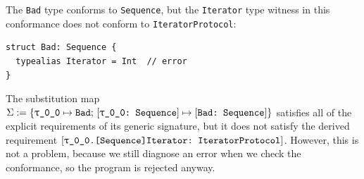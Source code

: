\documentclass[../generics]{subfiles}
\begin{document}
\begin{example}
The \texttt{Bad} type conforms to \texttt{Sequence}, but the \texttt{Iterator} type witness in this conformance does not conform to \texttt{IteratorProtocol}:
\begin{Verbatim}
struct Bad: Sequence {
  typealias Iterator = Int  // error
}
\end{Verbatim}
The substitution map
$\Sigma:=\SubstMapC{\SubstType{\rT}{Bad}}{\SubstConf{\rT}{Bad}{Sequence}}$ satisfies all of the explicit requirements of its generic signature, but it does not satisfy the derived requirement $\ConfReq{\rT.[Sequence]Iterator}{IteratorProtocol}$. However, this is not a problem, because we still diagnose an error when we check the conformance, so the program is rejected anyway.
\end{example}
\end{document}
